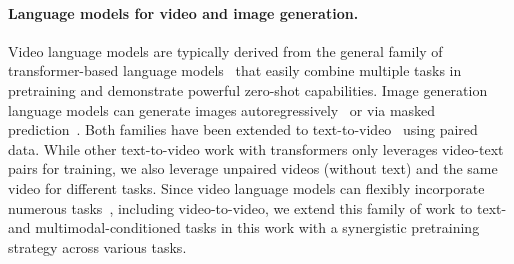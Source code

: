 \paragraph{Language models for video and image generation.}
Video language models are typically 
 derived from the general family of transformer-based language models~\cite{vaswani2017attention,raffel2020exploring} that easily combine multiple tasks in pretraining and demonstrate powerful zero-shot capabilities.
%
Image generation language models can generate images autoregressively~\cite{yu2022scaling} or via masked prediction~\cite{chang2022maskgit,chang2023muse}.
%
Both families have been extended to text-to-video~\cite{hong2022cogvideo,villegas2022phenaki,hu2023gaia,yan2021videogpt} using paired data.
%
While other text-to-video work with transformers only leverages video-text pairs for training, we also leverage unpaired videos (without text) and the same video for different tasks.
%
Since video language models can flexibly incorporate numerous tasks~\cite{yu2023magvit,nash2022transframer}, including video-to-video, we extend this family of work to text- and multimodal-conditioned tasks in this work with a synergistic pretraining strategy across various tasks.






